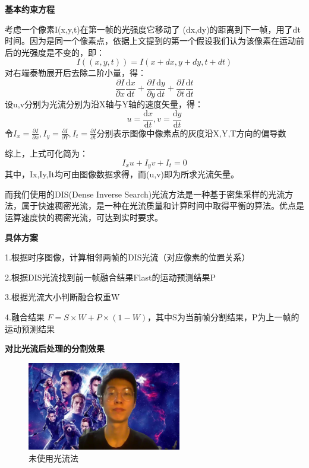 \documentclass[11pt]{article}
\begin{document}
\textbf{基本约束方程}

考虑一个像素I(x,y,t)在第一帧的光强度它移动了 (dx,dy)的距离到下一帧，用了dt时间。因为是同一个像素点，依据上文提到的第一个假设我们认为该像素在运动前后的光强度是不变的，即：
\[
I\left((x,y,t)\right) = I\left(x + dx,y+dy,t+dt\right)    
\]
对右端泰勒展开后去除二阶小量，得：
\[
\frac{\partial I}{\partial x} \frac{\mathrm{d} x}{\mathrm{d} t} +\frac{\partial I}{\partial y} \frac{\mathrm{d} y}{\mathrm{d} t}+\frac{\partial I}{\partial t} \frac{\mathrm{d} t}{\mathrm{d} t}
\]
设u,v分别为光流分别为沿X轴与Y轴的速度矢量，得：
\[
u = \frac{\mathrm{d} x}{\mathrm{d} t} ,v =\frac{\mathrm{d} y}{\mathrm{d} t}   
\]
令$I_x = \frac{\partial I}{\partial x} ,I_y =\frac{\partial I}{\partial Y} ,I_t=\frac{\partial I}{\partial t} $分别表示图像中像素点的灰度沿X,Y,T方向的偏导数

综上，上式可化简为：
\[
I_x u +I_y v+I_t = 0    
\]
其中，Ix,Iy,It均可由图像数据求得，而(u,v)即为所求光流矢量。

而我们使用的DIS(Dense Inverse Search)光流方法是一种基于密集采样的光流方法，属于快速稠密光流，是一种在光流质量和计算时间中取得平衡的算法。优点是运算速度快的稠密光流，可达到实时要求。

\textbf{具体方案}

1.根据时序图像，计算相邻两帧的DIS光流（对应像素的位置关系）

2.根据DIS光流找到前一帧融合结果Flast的运动预测结果P

3.根据光流大小判断融合权重W

4.融合结果 $F = S\times W + P\times \left(1-W\right)$，其中S为当前帧分割结果，P为上一帧的运动预测结果

\textbf{对比光流后处理的分割效果}

\begin{figure}[H]
    \centering
    \includegraphics[width = 0.6\textwidth]{output_shuai.jpg}
    \caption{未使用光流法}
    \label{fig:image7}

\end{figure}
\end{document}
